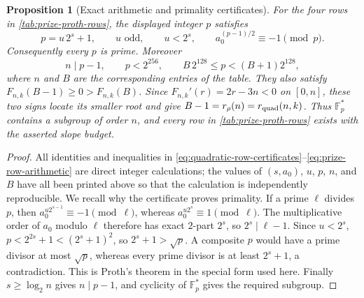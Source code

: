 \documentclass[11pt,a4paper]{amsart}
\numberwithin{equation}{section}
\newtheorem{proposition}[proposition]{Proposition}
\theoremstyle{remark}
\newcommand{\F}{\mathbb F}
\begin{document}
\begin{proposition}[Exact arithmetic and primality certificates]
\label{prop:proth-row-check}
For the four rows in \cref{tab:prize-proth-rows}, the displayed integer
\(p\) satisfies
\[
 p=u\,2^s+1,\qquad u\text{ odd},\qquad u<2^s,\qquad
 a_0^{(p-1)/2}\equiv-1\pmod p.                  \tag{PC1}
\label{eq:proth-certificates}
\]
Consequently every \(p\) is prime.  Moreover
\[
 n\mid p-1,\qquad p<2^{256},\qquad
 B\,2^{128}\le p<(B+1)2^{128},                  \tag{PC2}
\label{eq:prize-row-arithmetic}
\]
where \(n\) and \(B\) are the corresponding entries of the table.
They also satisfy \(F_{n,k}(B-1)\ge0>F_{n,k}(B)\).  Since
\(F_{n,k}'(r)=2r-3n<0\) on \([0,n]\), these two signs locate its smaller
root and give \(B-1=r_\rho(n)=r_{\rm quad}(n,k)\).
Thus \(\F_p^*\) contains a subgroup of order \(n\), and every row in
\cref{tab:prize-proth-rows} exists with the asserted slope budget.
\end{proposition}

\begin{proof}
All identities and inequalities in
\eqref{eq:quadratic-row-certificates}--\eqref{eq:prize-row-arithmetic}
are direct
integer calculations; the values of \((s,a_0)\), \(u\), \(p\), \(n\),
and \(B\) have all been printed above so that the calculation is
independently reproducible.  We recall why the certificate proves
primality.  If a prime \(\ell\) divides \(p\), then
\(a_0^{u2^{s-1}}\equiv-1\pmod\ell\), whereas
\(a_0^{u2^s}\equiv1\pmod\ell\).  The multiplicative order of \(a_0\)
modulo \(\ell\) therefore has exact \(2\)-part \(2^s\), so
\(2^s\mid\ell-1\).  Since \(u<2^s\),
\(p<2^{2s}+1<(2^s+1)^2\), so \(2^s+1>\sqrt p\).  A
composite \(p\) would have a prime divisor at most \(\sqrt p\), whereas
every prime divisor is at least \(2^s+1\), a contradiction.  This is Proth's theorem in the
special form used here.  Finally \(s\ge\log_2 n\) gives \(n\mid p-1\),
and cyclicity of \(\F_p^*\) gives the required subgroup.
\end{proof}
\end{document}
